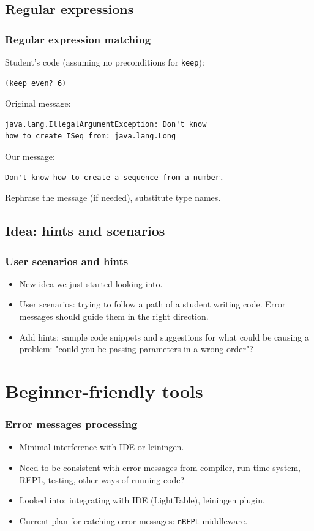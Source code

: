 \documentclass{beamer}
\begin{document}
\subsection{Regular expressions}
\begin{frame}[fragile]
 \frametitle {Regular expression matching}
Student's code (assuming no preconditions for {\tt keep}):
\begin{verbatim}
(keep even? 6)
\end{verbatim}
Original message:
\begin{verbatim}
java.lang.IllegalArgumentException: Don't know 
how to create ISeq from: java.lang.Long
\end{verbatim}
Our message:
\begin{verbatim}
Don't know how to create a sequence from a number. 
\end{verbatim}
Rephrase the message (if needed), substitute type names. 
\end{frame}


\subsection{Idea: hints and scenarios}

\begin{frame}
   \frametitle{User scenarios and hints}
\begin{itemize}
\item New idea we just started looking into.
\item User scenarios: trying to follow a path of a student writing code. Error messages should guide them in the right direction.
\item Add hints: sample code snippets and suggestions for what could be causing a problem: "could you be passing parameters in a wrong order"? 
\end{itemize}
\end{frame}

\section{Beginner-friendly tools}

\begin{frame}
   \frametitle{Error messages processing}
\begin{itemize}
\item Minimal interference with IDE or leiningen.
\item Need to be consistent with error messages from compiler,  run-time system, REPL, testing, other ways of running code?
\item Looked into: integrating with IDE (LightTable), leiningen plugin. 
\item Current plan for catching error messages: {\tt nREPL} middleware. 
\end{itemize}
\end{frame}
\end{document}
